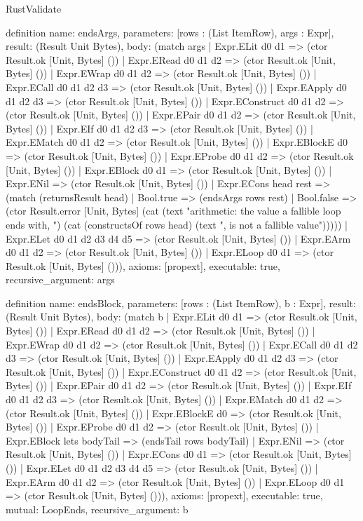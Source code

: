 \begin{lexlean}{RustValidate}
\begin{semanticmodule}
definition{
  name: endsArgs,
  parameters: [rows : (List ItemRow), args : Expr],
  result: (Result Unit Bytes),
  body: (match args
    | Expr.ELit d0 d1 => (ctor Result.ok [Unit, Bytes] ())
    | Expr.ERead d0 d1 d2 => (ctor Result.ok [Unit, Bytes] ())
    | Expr.EWrap d0 d1 d2 => (ctor Result.ok [Unit, Bytes] ())
    | Expr.ECall d0 d1 d2 d3 => (ctor Result.ok [Unit, Bytes] ())
    | Expr.EApply d0 d1 d2 d3 => (ctor Result.ok [Unit, Bytes] ())
    | Expr.EConstruct d0 d1 d2 => (ctor Result.ok [Unit, Bytes] ())
    | Expr.EPair d0 d1 d2 => (ctor Result.ok [Unit, Bytes] ())
    | Expr.EIf d0 d1 d2 d3 => (ctor Result.ok [Unit, Bytes] ())
    | Expr.EMatch d0 d1 d2 => (ctor Result.ok [Unit, Bytes] ())
    | Expr.EBlockE d0 => (ctor Result.ok [Unit, Bytes] ())
    | Expr.EProbe d0 d1 d2 => (ctor Result.ok [Unit, Bytes] ())
    | Expr.EBlock d0 d1 => (ctor Result.ok [Unit, Bytes] ())
    | Expr.ENil => (ctor Result.ok [Unit, Bytes] ())
    | Expr.ECons head rest => (match (returnsResult head)
      | Bool.true => (endsArgs rows rest)
      | Bool.false => (ctor Result.error [Unit, Bytes] (cat (text "arithmetic: the value a fallible loop ends with, ") (cat (constructsOf rows head) (text ", is not a fallible value")))))
    | Expr.ELet d0 d1 d2 d3 d4 d5 => (ctor Result.ok [Unit, Bytes] ())
    | Expr.EArm d0 d1 d2 => (ctor Result.ok [Unit, Bytes] ())
    | Expr.ELoop d0 d1 => (ctor Result.ok [Unit, Bytes] ())),
  axioms: [propext],
  executable: true,
  recursive_argument: args
}

definition{
  name: endsBlock,
  parameters: [rows : (List ItemRow), b : Expr],
  result: (Result Unit Bytes),
  body: (match b
    | Expr.ELit d0 d1 => (ctor Result.ok [Unit, Bytes] ())
    | Expr.ERead d0 d1 d2 => (ctor Result.ok [Unit, Bytes] ())
    | Expr.EWrap d0 d1 d2 => (ctor Result.ok [Unit, Bytes] ())
    | Expr.ECall d0 d1 d2 d3 => (ctor Result.ok [Unit, Bytes] ())
    | Expr.EApply d0 d1 d2 d3 => (ctor Result.ok [Unit, Bytes] ())
    | Expr.EConstruct d0 d1 d2 => (ctor Result.ok [Unit, Bytes] ())
    | Expr.EPair d0 d1 d2 => (ctor Result.ok [Unit, Bytes] ())
    | Expr.EIf d0 d1 d2 d3 => (ctor Result.ok [Unit, Bytes] ())
    | Expr.EMatch d0 d1 d2 => (ctor Result.ok [Unit, Bytes] ())
    | Expr.EBlockE d0 => (ctor Result.ok [Unit, Bytes] ())
    | Expr.EProbe d0 d1 d2 => (ctor Result.ok [Unit, Bytes] ())
    | Expr.EBlock lets bodyTail => (endsTail rows bodyTail)
    | Expr.ENil => (ctor Result.ok [Unit, Bytes] ())
    | Expr.ECons d0 d1 => (ctor Result.ok [Unit, Bytes] ())
    | Expr.ELet d0 d1 d2 d3 d4 d5 => (ctor Result.ok [Unit, Bytes] ())
    | Expr.EArm d0 d1 d2 => (ctor Result.ok [Unit, Bytes] ())
    | Expr.ELoop d0 d1 => (ctor Result.ok [Unit, Bytes] ())),
  axioms: [propext],
  executable: true,
  mutual: LoopEnds,
  recursive_argument: b
}


\end{semanticmodule}
\end{lexlean}
